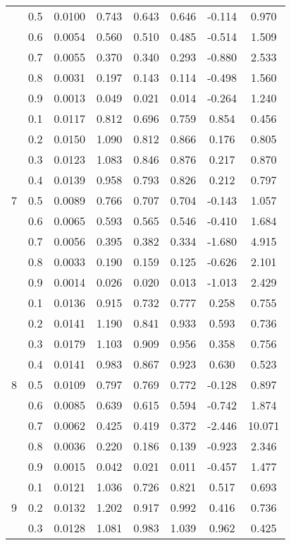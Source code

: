 \documentclass[11pt,a4paper]{report}
\begin{document}
\begin{longtable}{ | c | c || c | c | c | c | c | c | }
 & 0.5 & 0.0100 & 0.743 & 0.643 & 0.646 & -0.114 & 0.970 \\
 & 0.6 & 0.0054 & 0.560 & 0.510 & 0.485 & -0.514 & 1.509 \\
 & 0.7 & 0.0055 & 0.370 & 0.340 & 0.293 & -0.880 & 2.533 \\
 & 0.8 & 0.0031 & 0.197 & 0.143 & 0.114 & -0.498 & 1.560 \\
 & 0.9 & 0.0013 & 0.049 & 0.021 & 0.014 & -0.264 & 1.240 \\
 \hline
\multirow{9}{*}{7} & 0.1 & 0.0117 & 0.812 & 0.696 & 0.759 & 0.854 & 0.456 \\
 & 0.2 & 0.0150 & 1.090 & 0.812 & 0.866 & 0.176 & 0.805 \\
 & 0.3 & 0.0123 & 1.083 & 0.846 & 0.876 & 0.217 & 0.870 \\
 & 0.4 & 0.0139 & 0.958 & 0.793 & 0.826 & 0.212 & 0.797 \\
 & 0.5 & 0.0089 & 0.766 & 0.707 & 0.704 & -0.143 & 1.057 \\
 & 0.6 & 0.0065 & 0.593 & 0.565 & 0.546 & -0.410 & 1.684 \\
 & 0.7 & 0.0056 & 0.395 & 0.382 & 0.334 & -1.680 & 4.915 \\
 & 0.8 & 0.0033 & 0.190 & 0.159 & 0.125 & -0.626 & 2.101 \\
 & 0.9 & 0.0014 & 0.026 & 0.020 & 0.013 & -1.013 & 2.429 \\
 \hline
\multirow{9}{*}{8} & 0.1 & 0.0136 & 0.915 & 0.732 & 0.777 & 0.258 & 0.755 \\
 & 0.2 & 0.0141 & 1.190 & 0.841 & 0.933 & 0.593 & 0.736 \\
 & 0.3 & 0.0179 & 1.103 & 0.909 & 0.956 & 0.358 & 0.756 \\
 & 0.4 & 0.0141 & 0.983 & 0.867 & 0.923 & 0.630 & 0.523 \\
 & 0.5 & 0.0109 & 0.797 & 0.769 & 0.772 & -0.128 & 0.897 \\
 & 0.6 & 0.0085 & 0.639 & 0.615 & 0.594 & -0.742 & 1.874 \\
 & 0.7 & 0.0062 & 0.425 & 0.419 & 0.372 & -2.446 & 10.071 \\
 & 0.8 & 0.0036 & 0.220 & 0.186 & 0.139 & -0.923 & 2.346 \\
 & 0.9 & 0.0015 & 0.042 & 0.021 & 0.011 & -0.457 & 1.477 \\
 \hline
\multirow{9}{*}{9} & 0.1 & 0.0121 & 1.036 & 0.726 & 0.821 & 0.517 & 0.693 \\
 & 0.2 & 0.0132 & 1.202 & 0.917 & 0.992 & 0.416 & 0.736 \\
 & 0.3 & 0.0128 & 1.081 & 0.983 & 1.039 & 0.962 & 0.425 \\

\end{longtable}
\end{document}
